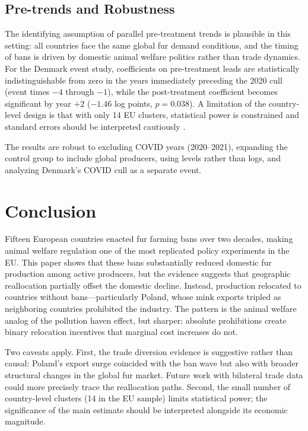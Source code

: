 \documentclass[12pt]{article}
\begin{document}


\subsection{Pre-trends and Robustness}

The identifying assumption of parallel pre-treatment trends is plausible in this setting: all countries face the same global fur demand conditions, and the timing of bans is driven by domestic animal welfare politics rather than trade dynamics. For the Denmark event study, coefficients on pre-treatment leads are statistically indistinguishable from zero in the years immediately preceding the 2020 cull (event times $-4$ through $-1$), while the post-treatment coefficient becomes significant by year $+2$ ($-1.46$ log points, $p = 0.038$). A limitation of the country-level design is that with only 14 EU clusters, statistical power is constrained and standard errors should be interpreted cautiously \citep{bertrand2004much}.

The results are robust to excluding COVID years (2020--2021), expanding the control group to include global producers, using levels rather than logs, and analyzing Denmark's COVID cull as a separate event.


\section{Conclusion}\label{sec:conclusion}

Fifteen European countries enacted fur farming bans over two decades, making animal welfare regulation one of the most replicated policy experiments in the EU. This paper shows that these bans substantially reduced domestic fur production among active producers, but the evidence suggests that geographic reallocation partially offset the domestic decline. Instead, production relocated to countries without bans---particularly Poland, whose mink exports tripled as neighboring countries prohibited the industry. The pattern is the animal welfare analog of the pollution haven effect, but sharper: absolute prohibitions create binary relocation incentives that marginal cost increases do not.

Two caveats apply. First, the trade diversion evidence is suggestive rather than causal: Poland's export surge coincided with the ban wave but also with broader structural changes in the global fur market. Future work with bilateral trade data could more precisely trace the reallocation paths. Second, the small number of country-level clusters (14 in the EU sample) limits statistical power; the significance of the main estimate should be interpreted alongside its economic magnitude.
\end{document}
